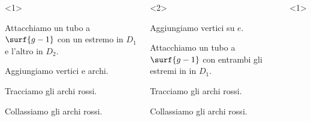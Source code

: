 \begin{frame}[fragile]
\begin{overprint}
\vspace{-1.5em}
\end{overprint}
\begin{overprint}
\begin{columns}[onlytextwidth]
\begin{onlyenv}<1>
\begin{enumarabic}
\item Attacchiamo un tubo a $\surf{g-1}$ con un estremo in $D_1$ e l'altro in $D_2$.
\item Aggiungiamo vertici e archi.
\item Tracciamo gli archi rossi.
\item Collassiamo gli archi rossi.
\end{enumarabic}
\end{onlyenv}
\begin{onlyenv}<2>
\begin{enumarabic}
\item Aggiungiamo vertici su $e$.
\item Attacchiamo un tubo a $\surf{g-1}$ con entrambi gli estremi in in $D_1$.
\item Tracciamo gli archi rossi.
\item Collassiamo gli archi rossi.
\end{enumarabic}
\end{onlyenv}
\begin{onlyenv}<1>
\def\picturesetupzero#1{
\pic{cmove setting two disks};
\path \surfcirclepoint{d1}{-90} coordinate (x-2);
\path \surfcirclepoint{d2}{-90} coordinate (y-2);
\ifnum#1=0
\path (x-2) pic{black vertex} node[below=3pt] {$x-2$};
\path (y-2) pic{black vertex} node[below=3pt] {$y-2$};
\fi
}
\def\picturesetupone#1{
\picturesetupzero{#1}
\pic{cmove setting two disks tube};
\tubefill{white};
}
\def\picturesetuptwo#1{
\picturesetupone{#1}
\tubebelt{black edge}{black edge dashed}
\path \tubemiddlepoint{90} coordinate (w1) pic{white vertex};
\path \tubemiddlepoint{135} coordinate (b1) pic{black vertex};
\path \tubemiddlepoint{180} coordinate (w2) pic {white vertex};
\path \tubemiddlepoint{225} coordinate (b2) pic {black vertex};
\tubeleftfill{disk 1}
\tuberightfill{disk 2}
}
\end{onlyenv}
\end{columns}
\end{overprint}
\end{frame}
